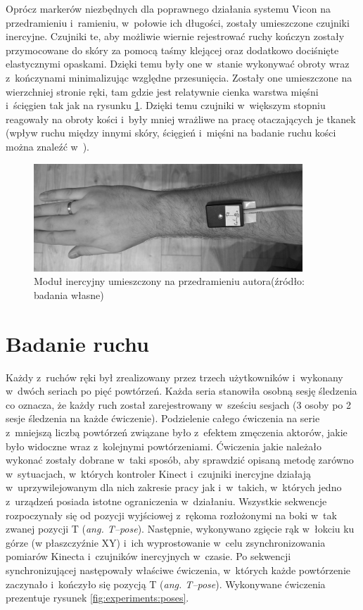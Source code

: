 Oprócz markerów niezbędnych dla poprawnego działania systemu Vicon na przedramieniu i~ramieniu, w~połowie ich długości, zostały umieszczone czujniki inercyjne. Czujniki te, aby możliwie wiernie rejestrować ruchy kończyn zostały przymocowane do skóry za pomocą taśmy klejącej oraz dodatkowo dociśnięte elastycznymi opaskami. Dzięki temu były one w~stanie wykonywać obroty wraz z~kończynami minimalizując względne przesunięcia. Zostały one umieszczone na wierzchniej stronie ręki, tam gdzie jest relatywnie cienka warstwa mięśni i~ścięgien tak jak na rysunku \ref{fig:experiments:handMarker}. Dzięki temu czujniki w~większym stopniu reagowały na obroty kości i~były mniej wrażliwe na pracę otaczających je tkanek (wpływ ruchu między innymi skóry, ścięgień i~mięśni na badanie ruchu kości można znaleźć w~\cite{Sati2016,Reinschmidt2016}).
				
\begin{figure}[!htb]
	\centering
	\includegraphics[width=0.9\textwidth]{images/WP_20170423_00_49_25_Raw.jpg}
	\caption{Moduł inercyjny umieszczony na przedramieniu autora(źródło: badania własne)}
	\label{fig:experiments:handMarker}
\end{figure}
				
\section{Badanie ruchu}
				
Każdy z~ruchów ręki był zrealizowany przez trzech użytkowników i~wykonany w~dwóch seriach po pięć powtórzeń. Każda seria stanowiła osobną sesję śledzenia co oznacza, że każdy ruch został zarejestrowany w~sześciu sesjach (3 osoby po 2 sesje śledzenia na każde ćwiczenie). Podzielenie całego ćwiczenia na serie z~mniejszą liczbą powtórzeń związane było z~efektem zmęczenia aktorów, jakie było widoczne wraz z~kolejnymi powtórzeniami. Ćwiczenia jakie należało wykonać zostały dobrane w~taki sposób, aby sprawdzić opisaną metodę zarówno w~sytuacjach, w~których kontroler Kinect i~czujniki inercyjne działają w~uprzywilejowanym dla nich zakresie pracy jak i~w~takich, w~których jedno z~urządzeń posiada istotne ograniczenia w~działaniu. Wszystkie sekwencje rozpoczynały się od pozycji wyjściowej z~rękoma rozłożonymi na boki w~tak zwanej pozycji T (\emph{ang. T--pose}). Następnie, wykonywano zgięcie rąk w~łokciu ku górze (w płaszczyźnie XY) i~ich wyprostowanie w~celu zsynchronizowania pomiarów Kinecta i~czujników inercyjnych w~czasie. Po sekwencji synchronizującej następowały właściwe ćwiczenia, w~których każde powtórzenie zaczynało i~kończyło się pozycją T (\emph{ang. T--pose}). Wykonywane ćwiczenia prezentuje rysunek \ref{fig:experiments:poses}.
			
